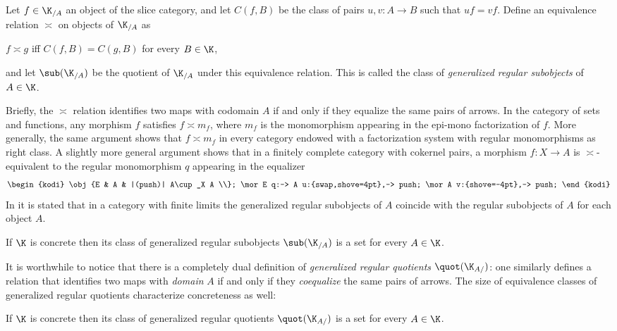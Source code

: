 \begin{definition}\label{grsdef} Let $f\in
\K_{/A}$ an object of the slice category, and let $C(f,B)$ be the class of pairs
$u,v : A \to B$ such that $uf=vf$. %
Define an equivalence relation $\asymp$ on objects of $\K_{/A}$ as
\begin{center}
$f\asymp g$ iff $C(f,B)=C(g,B)$ for every $B\in\K$, 
\end{center}
and let $\sub(\K_{/A})$ be the quotient of $\K_{/A}$ under this
equivalence relation. This is called the class of \emph{generalized regular
subobjects} of $A\in\K$.
\begin{remark}
Briefly, the $\asymp$ relation identifies two maps with codomain $A$ if and only if they equalize the same pairs of arrows. In the category of sets and functions, any morphism $f$ satisfies $f\asymp m_f$, where $m_f$ is the monomorphism appearing in the epi-mono factorization of $f$. More generally, the same argument shows that $f\asymp m_f$ in every category endowed with a factorization system with regular monomorphisms as right class. A slightly more general argument shows that in a finitely complete category with cokernel pairs, a morphism $f \colon X\to A$ is $\asymp$-equivalent to the regular monomorphism $q$ appearing in the equalizer
\[\notag
\begin{kodi}
\obj{E & A & |(push)| A\cup_X A \\};
\mor E q:-> A u:{swap,shove=4pt},-> push;
\mor A v:{shove=-4pt},-> push;
\end{kodi}
\]
In \cite{freyd1973concreteness} it is stated that in a category with finite limits the generalized regular subobjects of $A$ coincide with the regular subobjects of $A$ for each object $A$.
\end{remark}
\end{definition}
\begin{proposition}\label{isbell}
If $\K$ is concrete then its class of generalized regular subobjects $\sub(\K_{/A})$ is a set for every $A\in\K$.
\end{proposition}
It is worthwhile to notice that there is a completely dual definition of \emph{generalized regular quotients} $\quot(\K_{A/})$: one similarly defines a relation that identifies two maps with \emph{domain} $A$ if and only if they \emph{coequalize} the same pairs of arrows. The size of equivalence classes of generalized regular quotients characterize concreteness as well:
\begin{proposition}\label{coisbell}
If $\K$ is concrete then its class of generalized regular quotients $\quot(\K_{A/})$ is a set for every $A\in\K$.
\end{proposition}

